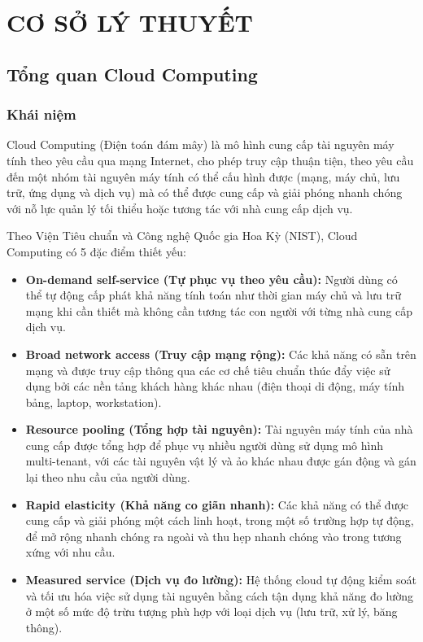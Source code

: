 \section{CƠ SỞ LÝ THUYẾT}\label{sec:co_so_ly_thuyet}

\subsection{Tổng quan Cloud Computing}

\subsubsection{Khái niệm}
Cloud Computing (Điện toán đám mây) là mô hình cung cấp tài nguyên máy tính theo yêu cầu qua mạng Internet, cho phép truy cập thuận tiện, theo yêu cầu đến một nhóm tài nguyên máy tính có thể cấu hình được (mạng, máy chủ, lưu trữ, ứng dụng và dịch vụ) mà có thể được cung cấp và giải phóng nhanh chóng với nỗ lực quản lý tối thiểu hoặc tương tác với nhà cung cấp dịch vụ.

Theo Viện Tiêu chuẩn và Công nghệ Quốc gia Hoa Kỳ (NIST), Cloud Computing có 5 đặc điểm thiết yếu:

\begin{itemize}
    \item \textbf{On-demand self-service (Tự phục vụ theo yêu cầu):} Người dùng có thể tự động cấp phát khả năng tính toán như thời gian máy chủ và lưu trữ mạng khi cần thiết mà không cần tương tác con người với từng nhà cung cấp dịch vụ.
    
    \item \textbf{Broad network access (Truy cập mạng rộng):} Các khả năng có sẵn trên mạng và được truy cập thông qua các cơ chế tiêu chuẩn thúc đẩy việc sử dụng bởi các nền tảng khách hàng khác nhau (điện thoại di động, máy tính bảng, laptop, workstation).
    
    \item \textbf{Resource pooling (Tổng hợp tài nguyên):} Tài nguyên máy tính của nhà cung cấp được tổng hợp để phục vụ nhiều người dùng sử dụng mô hình multi-tenant, với các tài nguyên vật lý và ảo khác nhau được gán động và gán lại theo nhu cầu của người dùng.
    
    \item \textbf{Rapid elasticity (Khả năng co giãn nhanh):} Các khả năng có thể được cung cấp và giải phóng một cách linh hoạt, trong một số trường hợp tự động, để mở rộng nhanh chóng ra ngoài và thu hẹp nhanh chóng vào trong tương xứng với nhu cầu.
    
    \item \textbf{Measured service (Dịch vụ đo lường):} Hệ thống cloud tự động kiểm soát và tối ưu hóa việc sử dụng tài nguyên bằng cách tận dụng khả năng đo lường ở một số mức độ trừu tượng phù hợp với loại dịch vụ (lưu trữ, xử lý, băng thông).
\end{itemize}

